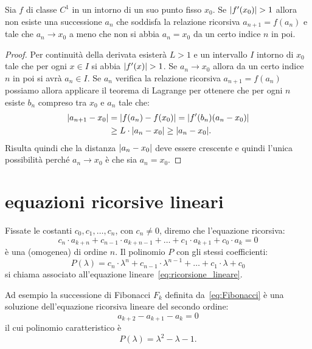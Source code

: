 \begin{theorem}
Sia $f$ di classe $C^1$ in un intorno di un suo punto fisso $x_0$.
Se ${\left|f'(x_0)\right|}>1$ allora non esiste una successione $a_n$ che soddisfa la relazione ricorsiva $a_{n+1} = f(a_n)$ e tale che $a_n \to x_0$ a meno che non si abbia $a_n = x_0$ da un certo indice $n$ in poi.
\end{theorem}
%
\begin{proof}
Per continuità della derivata esisterà $L>1$ e un intervallo $I$
intorno di $x_0$ tale che per ogni $x\in I$ si abbia ${\left|f'(x)\right|} > 1$.
Se $a_n \to x_0$ allora da un certo indice $n$
in poi si avrà $a_n \in I$.
Se $a_n$ verifica la relazione ricorsiva $a_{n+1} = f(a_n)$ possiamo
allora applicare il teorema di Lagrange per ottenere che per ogni $n$ esiste $b_n$ compreso tra $x_0$ e $a_n$ tale che:
\begin{align*}
  {\left|a_{n+1} - x_0\right|}
  &= {\left|f(a_n) - f(x_0)\right|}
  = {\left|f'(b_n)(a_n - x_0)\right|} \\
  &\ge L \cdot {\left|a_n - x_0\right|} \ge {\left|a_n - x_0\right|}.
\end{align*}
Risulta quindi che la distanza ${\left|a_n - x_0\right|}$ deve essere crescente
e quindi l'unica possibilità perché $a_n \to x_0$ è che sia $a_n = x_0$.
\end{proof}

\section{equazioni ricorsive lineari}
\label{sec:ricorrenza_lineare}

Fissate le costanti $c_0, c_1, \dots, c_n$,
con $c_n \neq 0$,
diremo che l'equazione ricorsiva:
\begin{equation}\label{eq:ricorsione_lineare}
  c_n \cdot a_{k+n} + c_{n-1} \cdot a_{k+n-1} + \dots
    + c_1 \cdot a_{k+1} + c_0 \cdot a_k = 0
\end{equation}
è una  (omogenea) di ordine $n$.
Il polinomio $P$ con gli stessi coefficienti:
\[
  P(\lambda) = c_n \cdot \lambda^n + c_{n-1}\cdot \lambda^{n-1} + \dots + c_1 \cdot \lambda + c_0
\]
si chiama 
%
associato all'equazione
lineare~\eqref{eq:ricorsione_lineare}.

Ad esempio la successione di Fibonacci $F_k$ definita da~\eqref{eq:Fibonacci}
è una soluzione dell'equazione ricorsiva lineare del secondo ordine:
\[
   a_{k+2} - a_{k+1} - a_{k} = 0
\]
il cui polinomio caratteristico è
\[
  P(\lambda) = \lambda^2 - \lambda - 1.
\]

